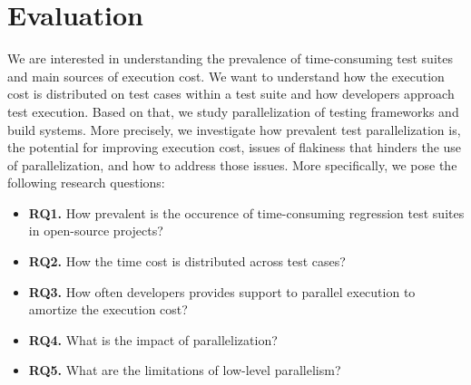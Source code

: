 \section{Evaluation}
\label{sec:eval}

We are interested in understanding the prevalence of time-consuming
test suites and main sources of execution cost. We want to understand
how the execution cost is distributed on test cases within a test
suite and how developers approach test execution. Based on that, we
study parallelization of testing frameworks and build systems.  More
precisely, we investigate how prevalent test parallelization is, the
potential for improving execution cost, issues of flakiness that
hinders the use of parallelization, and how to address those issues.
More specifically, we pose the following research questions:

\newcommand{\numRQA}{RQ1}
\newcommand{\numRQB}{RQ2}
\newcommand{\numRQC}{RQ3}
\newcommand{\numRQD}{RQ4}
\newcommand{\numRQF}{RQ5}

\newcommand{\RQA}{How prevalent is the occurence of time-consuming
  regression test suites in open-source projects?}
\newcommand{\RQB}{How the time cost is distributed across test cases?}
\newcommand{\RQC}{How often developers provides support to parallel
execution to amortize the execution cost?}
\newcommand{\RQD}{What is the impact of parallelization?}
\newcommand{\RQF}{What are the limitations of low-level parallelism?}

\begin{itemize}
    \item \textbf{\numRQA.} \RQA
    \item \textbf{\numRQB.} \RQB
    \item \textbf{\numRQC.} \RQC
    \item \textbf{\numRQD.} \RQD
    \item \textbf{\numRQF.} \RQF
\end{itemize}


